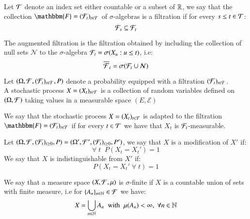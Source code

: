 \begin{definition}
Let $\mathcal{T}$ denote an index set either countable or a subset of $\mathbb{R}$, we say that the collection $\mathbbm{F} = (\F_{t})_{t \in \T}$ of $\sigma$-algebras is a filtration if for every $s\leq t \in \mathcal{T}$: 
\[
\mathcal{F}_{s}\subseteq \mathcal{F}_{t}
\]
\end{definition}

\begin{definition}
The augmented filtration is the filtration obtained by including the collection of null sets $\mathcal{N}$ to the $\sigma$-algebra $\mathcal{F}_{t} = \sigma(X_{u}:u\leq t)$, i.e:
\[
\overline{\mathcal{F}}_{t} = \sigma(\mathcal{F}_{t}\cup \mathcal{N})
\]
\end{definition}

\begin{definition}
Let $(\Omega, \mathcal{F}, (\mathcal{F}_{t})_{t\in \mathcal{T}}, P)$ denote a probability equipped with a filtration $(\mathcal{F}_{t})_{t\in \mathcal{T}}$.\\ 
A stochastic process $X = (X_{t})_{t\in \mathcal{T}}$ is a collection of random variables defined on $(\Omega, \mathcal{F})$ taking values in a measurable space $(E, \mathcal{E})$    
\end{definition}

\begin{definition}
We say that the stochastic process $X = (X_{t})_{t\in \mathcal{T}}$ is adapted to the filtration $\mathbbm{F} = (\F_{t})_{t \in \T}$ if for every $t\in \mathcal{T}$ we have that $X_{t}$ is $\mathcal{F}_{t}$-measurable. 
\end{definition}

\begin{definition}
Let $(\Omega, \mathcal{F}, (\mathcal{F}_{t})_{t\geq 0}, P) = (\Omega', \mathcal{F}',(\mathcal{F}_{t})_{t\geq 0}, P')$, we say that $X$ is a modification of $X'$ if:
\[
\forall\; t \;\; P(X_{t} = X_{t}') = 1
\]
We say that $X$ is indistinguishable from $X'$ if:
\[
P(X_{t} = X_{t}'\;\forall\; t) = 1
\]
\end{definition}

\begin{definition}
We say that a measure space $(X, \mathcal{F}, \mu)$ is $\sigma$-finite if $X$ is a countable union of sets with finite measure, i.e for $\{A_{n}\}_{n\in \mathbb{N}} \in \mathcal{F}$ we have: 
\begin{align*}
X = \bigcup_{n\in \mathbb{N}}A_{n}\;\;\text{with}\;\;\mu(A_{n}) < \infty,\; \forall n \in \mathbb{N}    
\end{align*}
\end{definition}

